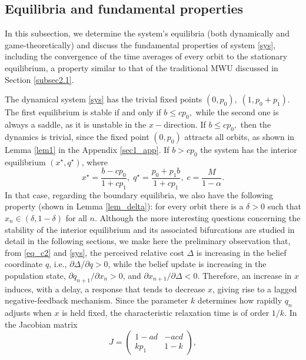 \documentclass{article}
\theoremstyle{plain}
\theoremstyle{definition}
\begin{document}
\subsection{Equilibria and fundamental properties}\label{sec2.2}
In this subsection, we determine the system's equilibria (both dynamically and game-theoretically) and discuss the fundamental properties of system \eqref{sys}, including the convergence of the time averages of every orbit to the stationary equilibrium, a property similar to that of the traditional MWU discussed in Section \ref{subsec2.1}.

The dynamical system \eqref{sys} has the trivial fixed points $(0,p_0), \; (1,p_0+p_1)$. The first equilibrium is stable if and only if $b\leq cp_0,$ while the second one is always a saddle, as it is unstable in the $x-$direction. If $b\leq cp_0,$ then the dynamics is trivial, since the fixed point $(0,p_0)$ attracts all orbits, as shown in Lemma \ref{lem1} in the Appendix \ref{sec1_app}. If $b>cp_0$ the system has the interior equilibrium $(x^\star, q^\star)$, where
\begin{equation}
x^\star=\frac{b-cp_0}{1+cp_1}, \; q^\star=\frac{p_0+p_1b}{1+cp_1}, \; c=\frac{M}{1-\alpha}.
\label{fp}
\end{equation}  
In that case, regarding the boundary equilibria, we also have the following property (shown in Lemma \ref{lem_delta}): for every orbit there is a $\delta>0$ such that $x_n \in (\delta,1-\delta)$ for all $n$. Although the more interesting questions concerning the stability of the interior equilibrium and its associated bifurcations are studied in detail in the following sections, we make here the preliminary observation that, from \eqref{eq_c2} and \eqref{sys}, the perceived relative cost $\Delta$ is increasing in the belief coordinate $q$, i.e., $\partial \Delta/\partial q>0$, while the belief update is increasing in the population state, $\partial q_{n+1}/\partial x_n>0$, and $\partial x_{n+1}/\partial \Delta<0$. Therefore, an increase in $x$ induces, with a delay, a response that tends to decrease $x$, giving rise to a lagged negative-feedback mechanism. Since the parameter $k$ determines how rapidly $q_n$ adjusts when $x$ is held fixed, the characteristic relaxation time is of order $1/k$. In the Jacobian matrix
\begin{equation}
J=
\begin{pmatrix}
1-ad & -acd\\
kp_1 & 1-k
\end{pmatrix},
\end{equation}
\end{document}
